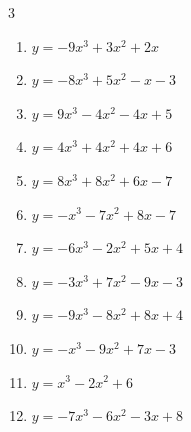 \begin{multicols}{3}
\begin{enumerate}
  \item $y=-9x^{3}+3x^{2}+2x$


  \item $y=-8x^{3}+5x^{2}-x-3$


  \item $y=9x^{3}-4x^{2}-4x+5$


  \item $y=4x^{3}+4x^{2}+4x+6$


  \item $y=8x^{3}+8x^{2}+6x-7$


  \item $y=-x^{3}-7x^{2}+8x-7$


  \item $y=-6x^{3}-2x^{2}+5x+4$


\columnbreak %

  \item $y=-3x^{3}+7x^{2}-9x-3$


  \item $y=-9x^{3}-8x^{2}+8x+4$


  \item $y=-x^{3}-9x^{2}+7x-3$


  \item $y=x^{3}-2x^{2}+6$


  \item $y=-7x^{3}-6x^{2}-3x+8$



\end{enumerate}
\end{multicols}
